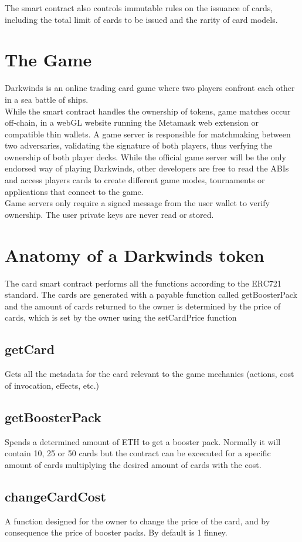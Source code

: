 \documentclass[11pt,twocolumn]{article}
\begin{document}
The smart contract also controls immutable rules on the issuance of cards, including the total limit of cards to be issued and the rarity of card models.


\section{The Game}
Darkwinds is an online trading card game where two players confront each other in a sea battle of ships.\\

While the smart contract handles the ownership of tokens, game matches occur off-chain, in a webGL website running the Metamask web extension or compatible thin wallets. A game server is responsible for matchmaking between two adversaries, validating the signature of both players, thus verfying the ownership of both player decks. While the official game server will be the only endorsed way of playing Darkwinds, other developers are free to read the ABIs and access players cards to create different game modes, tournaments or applications that connect to the game.\\

Game servers only require a signed message from the user wallet to verify ownership. The user private keys are never read or stored.


\section{Anatomy of a Darkwinds token}
The card smart contract performs all the functions according to the ERC721 \cite{notes} standard. The cards are generated with a payable function called getBoosterPack and the amount of cards returned to the owner is determined by the price of cards, which is set by the owner using the setCardPrice function
\subsection{getCard}
Gets all the metadata for the card relevant to the game mechanics (actions, cost of invocation, effects, etc.)
\subsection{getBoosterPack}
Spends a determined amount of ETH to get a booster pack. Normally it will contain 10, 25 or 50 cards but the contract can be excecuted for a specific amount of cards multiplying the desired amount of cards with the cost.
\subsection{changeCardCost}
A function designed for the owner to change the price of the card, and by consequence the price of booster packs. By default is 1 finney.
\end{document}
